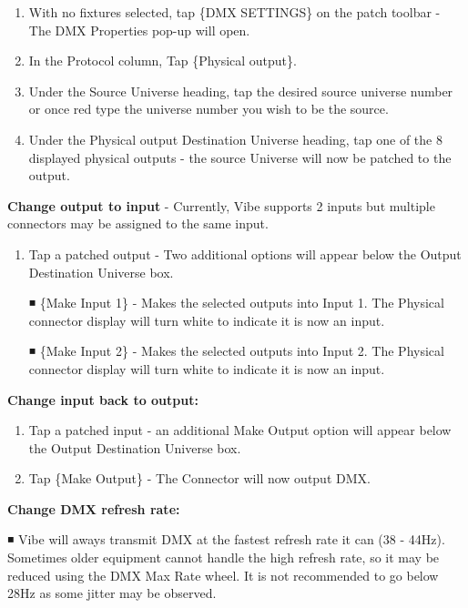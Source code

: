 \documentclass[
]{article}
\begin{document}
\begin{enumerate}
\def\labelenumi{\arabic{enumi}.}
\item
  With no fixtures selected, tap \{DMX SETTINGS\} on the patch toolbar - The DMX Properties pop-up will open.
\item
  In the Protocol column, Tap \{Physical output\}.
\item
  Under the Source Universe heading, tap the desired source universe number or once red type the universe number you wish to be the source.
\item
  Under the Physical output Destination Universe heading, tap one of the 8 displayed physical outputs - the source Universe will now be patched to the output.
\end{enumerate}

\textbf{Change output to input} - Currently, Vibe supports 2 inputs but multiple connectors may be assigned to the same input.

\begin{enumerate}
\def\labelenumi{\arabic{enumi}.}
\item
  Tap a patched output - Two additional options will appear below the Output Destination Universe box.

  ◾ \{Make Input 1\} - Makes the selected outputs into Input 1. The Physical connector display will turn white to indicate it is now an input.

  ◾ \{Make Input 2\} - Makes the selected outputs into Input 2. The Physical connector display will turn white to indicate it is now an input.
\end{enumerate}

\textbf{Change input back to output:}

\begin{enumerate}
\def\labelenumi{\arabic{enumi}.}
\item
  Tap a patched input - an additional Make Output option will appear below the Output Destination Universe box.
\item
  Tap \{Make Output\} - The Connector will now output DMX.
\end{enumerate}

\textbf{Change DMX refresh rate:}

◾ Vibe will aways transmit DMX at the fastest refresh rate it can (38 - 44Hz). Sometimes older equipment cannot handle the high refresh rate, so it may be reduced using the DMX Max Rate wheel. It is not recommended to go below 28Hz as some jitter may be observed.
\end{document}
